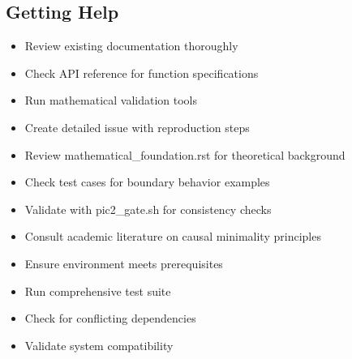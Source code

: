 \documentclass[letterpaper,10pt,english]{sphinxmanual}
\begin{document}
\subsection{Getting Help}
\label{\detokenize{contributing:getting-help}}
\sphinxAtStartPar
{}
\begin{itemize}
\item {} 
\sphinxAtStartPar
Review existing documentation thoroughly

\item {} 
\sphinxAtStartPar
Check API reference for function specifications

\item {} 
\sphinxAtStartPar
Run mathematical validation tools

\item {} 
\sphinxAtStartPar
Create detailed issue with reproduction steps

\end{itemize}

\sphinxAtStartPar
{}
\begin{itemize}
\item {} 
\sphinxAtStartPar
Review mathematical\_foundation.rst for theoretical background

\item {} 
\sphinxAtStartPar
Check test cases for boundary behavior examples

\item {} 
\sphinxAtStartPar
Validate with pic2\_gate.sh for consistency checks

\item {} 
\sphinxAtStartPar
Consult academic literature on causal minimality principles

\end{itemize}

\sphinxAtStartPar
{}
\begin{itemize}
\item {} 
\sphinxAtStartPar
Ensure environment meets prerequisites

\item {} 
\sphinxAtStartPar
Run comprehensive test suite

\item {} 
\sphinxAtStartPar
Check for conflicting dependencies

\item {} 
\sphinxAtStartPar
Validate system compatibility

\end{itemize}
\end{document}
